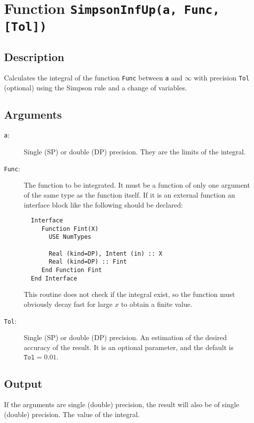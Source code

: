 \section{Function \texttt{SimpsonInfUp(a, Func, [Tol])}}

\subsection{Description}

Calculates the integral of the function \texttt{Func} between
\texttt{a} and $\infty$ with precision \texttt{Tol} (optional) using
the Simpson rule and a change of variables.


\subsection{Arguments}

\begin{description}
\item[\texttt{a}:] Single (SP) or double (DP) precision. They are
  the limits of the integral.
\item[\texttt{Func}:] The function to be integrated. It must be a
  function of only one argument of the same type as the function
  itself. If it is an
  external function an interface block like the following should be
  declared: 
\begin{verbatim}
  Interface 
     Function Fint(X)
       USE NumTypes

       Real (kind=DP), Intent (in) :: X
       Real (kind=DP) :: Fint
     End Function Fint
  End Interface
\end{verbatim}
  This routine does not check if the integral exist, so the function
  must obviously decay fast for large $x$ to obtain a finite value.
\item[\texttt{Tol}:] Single (SP) or double (DP) precision. An
  estimation of the desired accuracy of the result. It is an optional
  parameter, and the default is $\mathtt{Tol} = 0.01$. 
\end{description}


\subsection{Output}

If the arguments are single (double) precision, the result will also be of
single (double) precision. The value of the integral.


